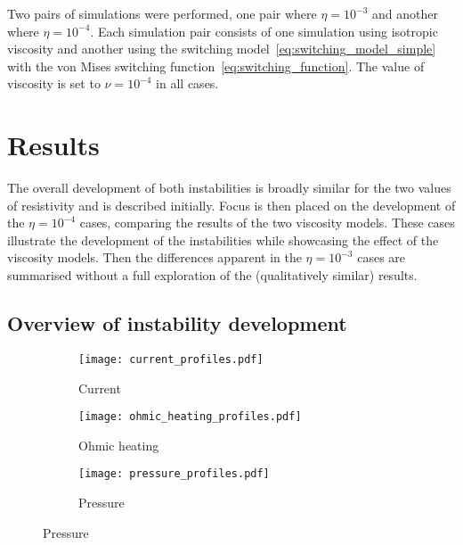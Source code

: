 Two pairs of simulations were performed, one pair where $\eta=10^{-3}$ and another where $\eta=10^{-4}$. Each simulation pair consists of one simulation using isotropic viscosity and another using the switching model~\eqref{eq:switching_model_simple} with the von Mises switching function~\eqref{eq:switching_function}. The value of viscosity is set to $\nu = 10^{-4}$ in all cases.

\section{Results}

The overall development of both instabilities is broadly similar for the two values of resistivity and is described initially. Focus is then placed on the development of the $\eta=10^{-4}$ cases, comparing the results of the two viscosity models. These cases illustrate the development of the instabilities while showcasing the effect of the viscosity models. Then the differences apparent in the $\eta=10^{-3}$ cases are summarised without a full exploration of the (qualitatively similar) results.

\subsection{Overview of instability development}

\begin{figure}[t]
  \centering
    \begin{subfigure}{0.32\textwidth}
      \texttt{[image: current\_profiles.pdf]}
      \caption{Current}
      \label{fig:current_profiles}
    \end{subfigure}
    \hfill
    \begin{subfigure}{0.32\textwidth}
      \texttt{[image: ohmic\_heating\_profiles.pdf]}
      \caption{Ohmic heating}
      \label{fig:kink_straight_ohmic_heating_profile}
    \end{subfigure}
    \hfill
    \begin{subfigure}{0.32\textwidth}
      \texttt{[image: pressure\_profiles.pdf]}
      \caption{Pressure}
      \label{fig:pressure_profiles}
    \end{subfigure}
  \label{fig:pressure_and_heating}
\end{figure}

